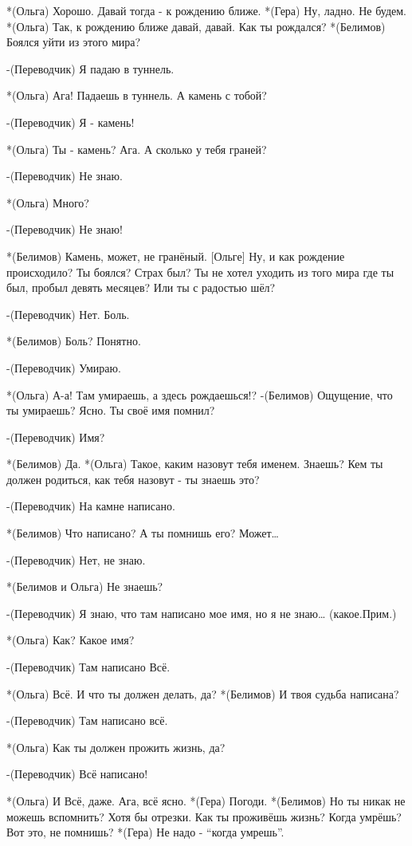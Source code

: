 *(Ольга) Хорошо. Давай тогда - к рождению ближе.
*(Гера) Ну, ладно. Не будем.
*(Ольга) Так, к рождению ближе давай, давай. Как ты рождался?
*(Белимов) Боялся уйти из этого мира?

-(Переводчик) Я падаю в туннель.

*(Ольга) Ага!  Падаешь в туннель. А камень с тобой?

-(Переводчик) Я - камень!

*(Ольга) Ты - камень? Ага. А сколько у тебя граней?

-(Переводчик) Не знаю.

*(Ольга) Много?

-(Переводчик) Не знаю!

*(Белимов) Камень, может, не гранёный. [Ольге] Ну, и как рождение происходило? Ты боялся? Страх был? Ты не хотел уходить из того мира где ты был, пробыл девять месяцев? Или ты с радостью шёл?

-(Переводчик) Нет. Боль.

*(Белимов) Боль? Понятно.

-(Переводчик) Умираю.

*(Ольга) А-а! Там умираешь, а здесь рождаешься!?
-(Белимов) Ощущение, что ты умираешь? Ясно. Ты своё имя помнил?

-(Переводчик) Имя?

*(Белимов) Да.
*(Ольга) Такое, каким назовут тебя именем. Знаешь? Кем ты должен родиться, как тебя назовут - ты знаешь это?

-(Переводчик) На камне написано.

*(Белимов) Что написано? А ты помнишь его? Может…

-(Переводчик) Нет, не знаю.

*(Белимов и Ольга) Не знаешь?

-(Переводчик) Я знаю, что там написано мое имя, но я не знаю… (какое.Прим.)

*(Ольга) Как? Какое имя?

-(Переводчик) Там написано Всё.

*(Ольга) Всё. И что ты должен делать, да?
*(Белимов) И твоя судьба написана?

-(Переводчик) Там написано всё.

*(Ольга) Как ты должен прожить жизнь, да?

-(Переводчик) Всё написано!

*(Ольга) И Всё, даже. Ага, всё ясно.
*(Гера) Погоди.
*(Белимов) Но ты никак не можешь вспомнить? Хотя бы отрезки. Как ты проживёшь жизнь? Когда умрёшь? Вот это, не помнишь? 
*(Гера) Не надо - “когда умрешь”.

